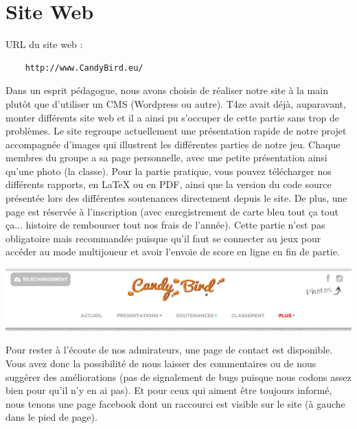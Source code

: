 \documentclass [11pt]{report}
\begin{document}
	 \vspace{10mm}
	 
	\section{Site Web}
	
	URL du site web : 
	\begin{Verbatim}
	http://www.CandyBird.eu/
	\end{Verbatim}
	
	Dans un esprit pédagogue, nous avons choisis de réaliser notre site à la main plutôt que d'utiliser un CMS (Wordpress ou autre). T4ze avait déjà, auparavant, monter différents site web et il a ainsi pu s'occuper de cette partie sans trop de problèmes. Le site regroupe actuellement une présentation rapide de notre projet accompagnée d'images qui illustrent les différentes parties de notre jeu. Chaque membres du groupe a sa page personnelle, avec une petite présentation ainsi qu'une photo (la classe). Pour la partie pratique, vous pouvez télécharger nos différents rapports, en LaTeX ou en PDF, ainsi que la version du code source présentée lors des différentes soutenances directement depuis le site. De plus, une page est réservée à l'inscription (avec enregistrement de carte bleu tout ça tout ça... histoire de rembourser tout nos frais de l'année). Cette partie n'est pas obligatoire mais recommandée puisque qu'il faut se connecter au jeux pour accéder au mode multijoueur et avoir l'envoie de score en ligne en fin de partie.\\
	\vspace{4mm}
	\begin{center}
	\includegraphics[scale=0.5]{images/site.png}
	\end{center}
	
	\vspace{10mm}
	
	Pour rester à l'écoute de nos admirateurs, une page de contact est disponible. Vous avez donc la possibilité de nous laisser des commentaires ou de nous suggérer des améliorations (pas de signalement de bugs puisque nous codons assez bien pour qu'il n'y en ai pas). Et pour ceux qui aiment être toujours informé, nous tenons une page facebook dont un raccourci est visible sur le site (à gauche dans le pied de page).
	
\end{document}
